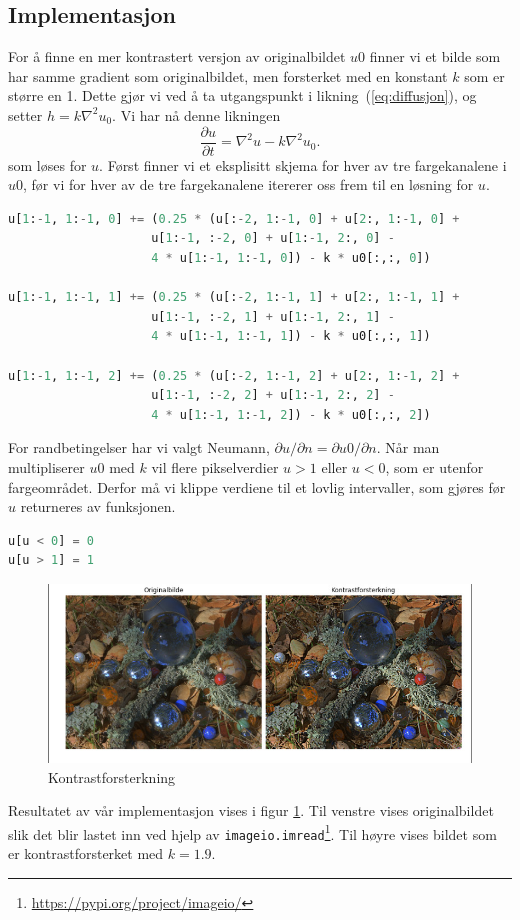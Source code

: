 \subsection{Implementasjon}
For å finne en mer kontrastert versjon av originalbildet $u0$ finner vi et bilde som har samme gradient som originalbildet, men forsterket med en konstant $k$ som er større en 1. Dette gjør vi ved å ta utgangspunkt i likning~(\ref{eq:diffusjon}), og setter $h = k \nabla^2 u_0$. Vi har nå denne likningen
\begin{equation}
\frac{\partial u}{\partial t} = \nabla^2 u - k \nabla^2 u_0.
\label{eq:contrast}
\end{equation}
som løses for $u$. Først finner vi et eksplisitt skjema for hver av tre fargekanalene i  $u0$, før vi for hver av de tre fargekanalene itererer oss frem til en løsning for $u$.

\begin{lstlisting}[language=Python]
u[1:-1, 1:-1, 0] += (0.25 * (u[:-2, 1:-1, 0] + u[2:, 1:-1, 0] + 
                    u[1:-1, :-2, 0] + u[1:-1, 2:, 0] - 
                    4 * u[1:-1, 1:-1, 0]) - k * u0[:,:, 0])
                    
u[1:-1, 1:-1, 1] += (0.25 * (u[:-2, 1:-1, 1] + u[2:, 1:-1, 1] + 
                    u[1:-1, :-2, 1] + u[1:-1, 2:, 1] - 
                    4 * u[1:-1, 1:-1, 1]) - k * u0[:,:, 1])
                    
u[1:-1, 1:-1, 2] += (0.25 * (u[:-2, 1:-1, 2] + u[2:, 1:-1, 2] + 
                    u[1:-1, :-2, 2] + u[1:-1, 2:, 2] - 
                    4 * u[1:-1, 1:-1, 2]) - k * u0[:,:, 2])
\end{lstlisting}
For randbetingelser har vi valgt Neumann, $\partial u / \partial n = \partial u0 / \partial n$. Når man multipliserer $u0$ med $k$ vil flere pikselverdier $u > 1$ eller $u < 0$, som er utenfor fargeområdet. Derfor må vi klippe verdiene til et lovlig intervaller, som gjøres før $u$ returneres av funksjonen.
\begin{lstlisting}[language=Python]
u[u < 0] = 0  
u[u > 1] = 1
\end{lstlisting}
\begin{figure}
\begin{center}
    \includegraphics[width=1\columnwidth]{bilder/contrastEnhanced.jpg}
    \caption{Kontrastforsterkning \label{Figur 3}}
\end{center}
\end{figure}
Resultatet av vår implementasjon vises i figur \ref{Figur 3}. Til venstre vises originalbildet slik det blir lastet inn ved hjelp av \texttt{imageio.imread}\footnote{\url{https://pypi.org/project/imageio/}}. Til høyre vises bildet som er kontrastforsterket med $k = 1.9$.
